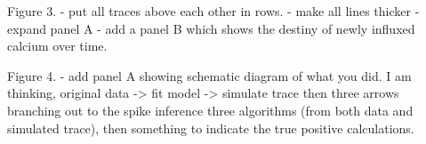 
Figure 3.
- put all traces above each other in rows.
- make all lines thicker
- expand panel A
- add a panel B which shows the destiny of newly influxed calcium over time.

Figure 4.
- add panel A showing schematic diagram of what you did. I am thinking, original data -> fit model -> simulate trace then three arrows branching out to the spike inference three algorithms (from both data and simulated trace), then something to indicate the true positive calculations.
